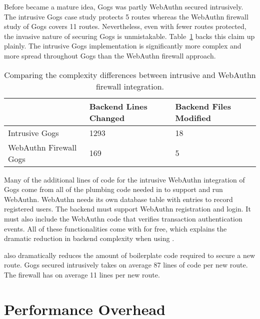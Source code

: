 Before \sys{} became a mature idea, Gogs was partly WebAuthn secured intrusively. The intrusive Gogs case study protects 5 routes whereas the WebAuthn firewall study of Gogs covers 11 routes. Nevertheless, even with fewer routes protected, the invasive nature of securing Gogs is unmistakable. Table~\ref{Table:EvaluationsComplexityDiffIntrusiveFirewall} backs this claim up plainly. The intrusive Gogs implementation is significantly more complex and more spread throughout Gogs than the WebAuthn firewall approach.

\begin{table}[h]
\centering

\begin{tabular}{ m{5cm} m{4.5cm} m{4.5cm}  } 
 \hline
 & Backend Lines Changed & Backend Files Modified \\ 
 \hline \hline

 Intrusive Gogs & 1293 & 18 \\ \hline

 WebAuthn Firewall Gogs & 169 & 5 \\ \hline


\end{tabular}
\caption{Comparing the complexity differences between intrusive and WebAuthn firewall integration.}
\label{Table:EvaluationsComplexityDiffIntrusiveFirewall}
\end{table}

Many of the additional lines of code for the intrusive WebAuthn integration of Gogs come from all of the plumbing code needed in to support and run WebAuthn. WebAuthn needs its own database table with entries to record registered users. The backend must support WebAuthn registration and login. It must also include the WebAuthn code that verifies transaction authentication events. All of these functionalities come with \sys{} for free, which explains the dramatic reduction in backend complexity when using \sys{}.

\sys{} also dramatically reduces the amount of boilerplate code required to secure a new route. Gogs secured intrusively takes on average 87 lines of code per new route. The firewall has on average 11 lines per new route.



\section{Performance Overhead}

